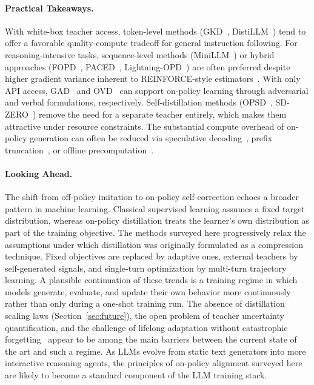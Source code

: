 \documentclass{article} %
\begin{document}
\paragraph{Practical Takeaways.} With white-box teacher access, token-level methods (GKD~\citep{2306.13649}, DistiLLM~\citep{2402.03898}) tend to offer a favorable quality-compute tradeoff for general instruction following. For reasoning-intensive tasks, sequence-level methods (MiniLLM~\citep{2306.08543}) or hybrid approaches (FOPD~\citep{2602.15260}, PACED~\citep{2603.11178}, Lightning-OPD~\citep{2604.13010}) are often preferred despite higher gradient variance inherent to REINFORCE-style estimators~\citep{2306.08543}. With only API access, GAD~\citep{2511.10643} and OVD~\citep{2601.21968} can support on-policy learning through adversarial and verbal formulations, respectively. Self-distillation methods (OPSD~\citep{2601.18734}, SD-ZERO~\citep{2604.12002}) remove the need for a separate teacher entirely, which makes them attractive under resource constraints. The substantial compute overhead of on-policy generation can often be reduced via speculative decoding~\citep{2410.11325}, prefix truncation~\citep{2602.15260}, or offline precomputation~\citep{2604.13010}.

\paragraph{Looking Ahead.} The shift from off-policy imitation to on-policy self-correction echoes a broader pattern in machine learning. Classical supervised learning assumes a fixed target distribution, whereas on-policy distillation treats the learner's own distribution as part of the training objective. The methods surveyed here progressively relax the assumptions under which distillation was originally formulated as a compression technique. Fixed objectives are replaced by adaptive ones, external teachers by self-generated signals, and single-turn optimization by multi-turn trajectory learning. A plausible continuation of these trends is a training regime in which models generate, evaluate, and update their own behavior more continuously rather than only during a one-shot training run. The absence of distillation scaling laws (Section~\ref{sec:future}), the open problem of teacher uncertainty quantification, and the challenge of lifelong adaptation without catastrophic forgetting~\citep{1612.00796} appear to be among the main barriers between the current state of the art and such a regime. As LLMs evolve from static text generators into more interactive reasoning agents, the principles of on-policy alignment surveyed here are likely to become a standard component of the LLM training stack.
\end{document}
